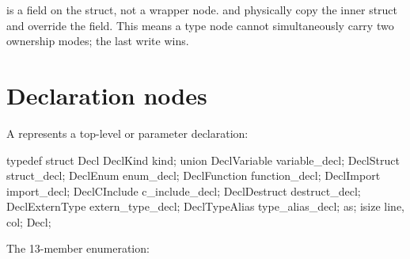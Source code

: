 \begin{invariant}
 is a field on the  struct, not a wrapper node.
 and  physically copy the inner struct and
override the  field.  This means a type node cannot simultaneously
carry two ownership modes; the last write wins.
\end{invariant}

\section{Declaration nodes}
\label{sec:ast-decls}

\pnum
A  represents a top-level or parameter declaration:

\begin{ccode}
typedef struct Decl {
    DeclKind kind;
    union { DeclVariable variable_decl; DeclStruct struct_decl;
            DeclEnum enum_decl; DeclFunction function_decl;
            DeclImport import_decl; DeclCInclude c_include_decl;
            DeclDestruct destruct_decl; DeclExternType extern_type_decl;
            DeclTypeAlias type_alias_decl; } as;
    isize line, col;
} Decl;
\end{ccode}

\pnum
The 13-member  enumeration:

